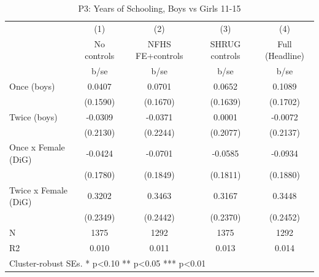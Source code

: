 \begin{table}[htbp]\centering
\def\sym#1{\ifmmode^{#1}\else\(^{#1}\)\fi}
\caption{P3: Years of Schooling, Boys vs Girls 11-15}
\begin{tabular}{l*{4}{c}}
\toprule
            &\multicolumn{1}{c}{(1)}   &\multicolumn{1}{c}{(2)}   &\multicolumn{1}{c}{(3)}   &\multicolumn{1}{c}{(4)}   \\
            & No controls   &NFHS FE+controls   &SHRUG controls   &Full (Headline)   \\
            &        b/se   &        b/se   &        b/se   &        b/se   \\
\midrule
Once (boys) &      0.0407   &      0.0701   &      0.0652   &      0.1089   \\
            &    (0.1590)   &    (0.1670)   &    (0.1639)   &    (0.1702)   \\
Twice (boys)&     -0.0309   &     -0.0371   &      0.0001   &     -0.0072   \\
            &    (0.2130)   &    (0.2244)   &    (0.2077)   &    (0.2137)   \\
Once x Female (DiG)&     -0.0424   &     -0.0701   &     -0.0585   &     -0.0934   \\
            &    (0.1780)   &    (0.1849)   &    (0.1811)   &    (0.1880)   \\
Twice x Female (DiG)&      0.3202   &      0.3463   &      0.3167   &      0.3448   \\
            &    (0.2349)   &    (0.2442)   &    (0.2370)   &    (0.2452)   \\
\midrule
N           &        1375   &        1292   &        1375   &        1292   \\
R2          &       0.010   &       0.011   &       0.013   &       0.014   \\
\bottomrule
\multicolumn{5}{l}{\footnotesize Cluster-robust SEs. * p<0.10 ** p<0.05 *** p<0.01}\\
\end{tabular}
\end{table}
